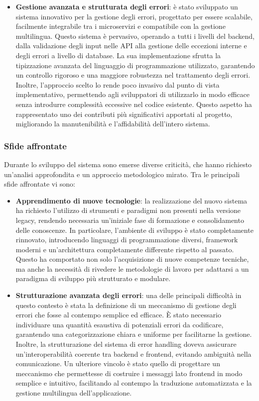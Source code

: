 \begin{itemize}
  \item \textbf{Gestione avanzata e strutturata degli errori}: è stato sviluppato un sistema innovativo per la gestione degli errori, progettato per essere scalabile, facilmente integrabile tra i microservizi e compatibile con la gestione multilingua. Questo sistema è pervasivo, operando a tutti i livelli del backend, dalla validazione degli input nelle API alla gestione delle eccezioni interne e degli errori a livello di database. La sua implementazione sfrutta la tipizzazione avanzata del linguaggio di programmazione utilizzato, garantendo un controllo rigoroso e una maggiore robustezza nel trattamento degli errori. Inoltre, l’approccio scelto lo rende poco invasivo dal punto di vista implementativo, permettendo agli sviluppatori di utilizzarlo in modo efficace senza introdurre complessità eccessive nel codice esistente. Questo aspetto ha rappresentato uno dei contributi più significativi apportati al progetto, migliorando la manutenibilità e l'affidabilità dell’intero sistema.
\end{itemize}

\subsubsection{Sfide affrontate}
Durante lo sviluppo del sistema sono emerse diverse criticità, che hanno richiesto un'analisi approfondita e un approccio metodologico mirato. Tra le principali sfide affrontate vi sono:

\begin{itemize}
  \item \textbf{Apprendimento di nuove tecnologie}: la realizzazione del nuovo sistema ha richiesto l’utilizzo di strumenti e paradigmi non presenti nella versione legacy, rendendo necessaria un'iniziale fase di formazione e consolidamento delle conoscenze. In particolare, l’ambiente di sviluppo è stato completamente rinnovato, introducendo linguaggi di programmazione diversi, framework moderni e un'architettura completamente differente rispetto al passato. Questo ha comportato non solo l'acquisizione di nuove competenze tecniche, ma anche la necessità di rivedere le metodologie di lavoro per adattarsi a un paradigma di sviluppo più strutturato e modulare.

  \item \textbf{Strutturazione avanzata degli errori}: una delle principali difficoltà in questo contesto è stata la definizione di un meccanismo di gestione degli errori che fosse al contempo semplice ed efficace. È stato necessario individuare una quantità esaustiva di potenziali errori da codificare, garantendo una categorizzazione chiara e uniforme per facilitarne la gestione. Inoltre, la strutturazione del sistema di error handling doveva assicurare un'interoperabilità coerente tra backend e frontend, evitando ambiguità nella comunicazione. Un ulteriore vincolo è stato quello di progettare un meccanismo che permettesse di costruire i messaggi lato frontend in modo semplice e intuitivo, facilitando al contempo la traduzione automatizzata e la gestione multilingua dell’applicazione.
\end{itemize}

